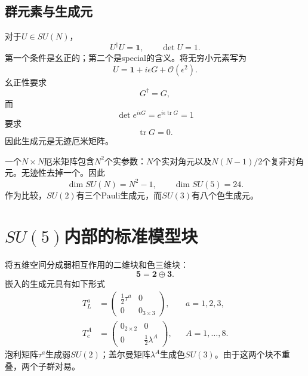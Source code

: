 \subsection{群元素与生成元}

对于\(U\in SU(N)\)，
\begin{equation}
U^\dagger U=\mathbf1,
\qquad
\det U=1.
\label{eq:l9-SUN-def}
\end{equation}
第一个条件是幺正的；第二个是special的含义。将无穷小元素写为
\begin{equation}
U=\mathbf1+i\epsilon G+\mathcal O(\epsilon^2).
\label{eq:l9-infinitesimal-U}
\end{equation}
幺正性要求
\begin{equation}
G^\dagger=G,
\end{equation}
而
\begin{equation}
\det e^{i\epsilon G}
=e^{i\epsilon\operatorname{tr}G}=1
\end{equation}
要求
\begin{equation}
\operatorname{tr}G=0.
\end{equation}
因此生成元是无迹厄米矩阵。

一个\(N\times N\)厄米矩阵包含\(N^2\)个实参数：\(N\)个实对角元以及\(N(N-1)/2\)个复非对角元。无迹性去掉一个。因此
\begin{equation}
\dim SU(N)=N^2-1,
\qquad
\dim SU(5)=24.
\label{eq:l9-SU5-dimension}
\end{equation}
作为比较，\(SU(2)\)有三个Pauli生成元，而\(SU(3)\)有八个色生成元。

\section{\texorpdfstring{\(SU(5)\)}{SU(5)}内部的标准模型块}

将五维空间分成弱相互作用的二维块和色三维块：
\begin{equation}
\mathbf5=\mathbf2\oplus\mathbf3.
\end{equation}
嵌入的生成元具有如下形式
\begin{align}
T^a_L
&=
\begin{pmatrix}
\tfrac12\tau^a&0\\
0&0_{3\times3}
\end{pmatrix},
&& a=1,2,3,
\label{eq:l9-SU2-block}\\
T^A_c
&=
\begin{pmatrix}
0_{2\times2}&0\\
0&\tfrac12\lambda^A
\end{pmatrix},
&& A=1,\ldots,8.
\label{eq:l9-SU3-block}
\end{align}
泡利矩阵\(\tau^a\)生成弱\(SU(2)\)；盖尔曼矩阵\(\lambda^A\)生成色\(SU(3)\)。由于这两个块不重叠，两个子群对易。

